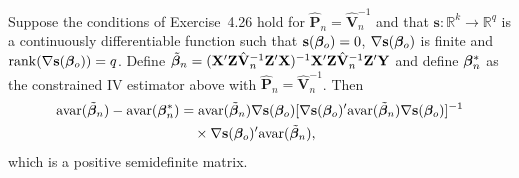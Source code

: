 \begin{theorem}\label{thm:4.49}
Suppose the conditions of Exercise~4.26 hold for $\hat{\mathbf{P}}_n = \hat{\mathbf{V}}_n^{-1}$ and that $\mathbf{s} : \mathbb{R}^k \to \mathbb{R}^q$ is a continuously differentiable function such that $\mathbf{s}(\boldsymbol{\beta}_o) = 0$, $\nabla \mathbf{s}(\boldsymbol{\beta}_o)$ is finite and $\mathrm{rank}(\nabla \mathbf{s}(\boldsymbol{\beta}_o)) = q$. Define $\tilde{\boldsymbol{\beta}}_n = (\mathbf{X}'\mathbf{Z}\hat{\mathbf{V}}_n^{-1}\mathbf{Z}'\mathbf{X})^{-1}\mathbf{X}'\mathbf{Z}\hat{\mathbf{V}}_n^{-1}\mathbf{Z}'\mathbf{Y}$ and define $\boldsymbol{\beta}_n^*$ as the constrained IV estimator above with $\hat{\mathbf{P}}_n = \hat{\mathbf{V}}_n^{-1}$. Then
\begin{align*}
\mathrm{avar}(\tilde{\boldsymbol{\beta}}_n) - \mathrm{avar}(\boldsymbol{\beta}_n^*) &= \mathrm{avar}(\tilde{\boldsymbol{\beta}}_n)\nabla \mathbf{s}(\boldsymbol{\beta}_o)[\nabla \mathbf{s}(\boldsymbol{\beta}_o)'\mathrm{avar}(\tilde{\boldsymbol{\beta}}_n)\nabla \mathbf{s}(\boldsymbol{\beta}_o)]^{-1} \\
&\quad\times \nabla \mathbf{s}(\boldsymbol{\beta}_o)'\mathrm{avar}(\tilde{\boldsymbol{\beta}}_n),
\end{align*}
which is a positive semidefinite matrix.
\end{theorem}

